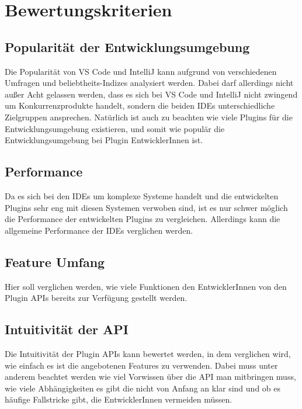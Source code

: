 \chapter{Bewertungskriterien}
\label{cha:Kriterien}

\section{Popularität der Entwicklungsumgebung}
\label{sec:Kriterien_Popularität}

Die Popularität von VS Code und IntelliJ kann aufgrund
von verschiedenen Umfragen und beliebtheits-Indizes 
analysiert werden. Dabei darf allerdings nicht außer
Acht gelassen werden, dass es sich bei VS Code und
IntelliJ nicht zwingend um Konkurrenzprodukte handelt,
sondern die beiden IDEs unterschiedliche Zielgruppen ansprechen.
Natürlich ist auch zu beachten wie viele Plugins 
für die Entwicklungsumgebung existieren, und somit wie 
populär die Entwicklungsumgebung bei Plugin EntwicklerInnen ist. 


\section{Performance}
\label{sec:Kriterien_Performance}

Da es sich bei den IDEs um komplexe Systeme handelt und die 
entwickelten Plugins sehr eng mit diesen Systemen verwoben sind,
ist es nur schwer möglich die Performance der entwickelten
Plugins zu vergleichen. Allerdings kann die allgemeine
Performance der IDEs verglichen werden.


\section{Feature Umfang}
\label{sec:Kriterien_FeatureUmfang}

Hier soll verglichen werden, wie viele Funktionen
den EntwicklerInnen von den Plugin APIs 
bereits zur Verfügung gestellt werden.


\section{Intuitivität der API}
\label{sec:Kriterien_Intuitivität}

Die Intuitivität der Plugin APIs kann bewertet werden,
in dem verglichen wird, wie einfach es ist die
angebotenen Features zu verwenden.
Dabei muss unter anderem beachtet werden wie viel Vorwissen über die
API man mitbringen muss, wie viele Abhängigkeiten es
gibt die nicht von Anfang an klar sind und ob es 
häufige Fallstricke gibt, die EntwicklerInnen vermeiden müssen.


